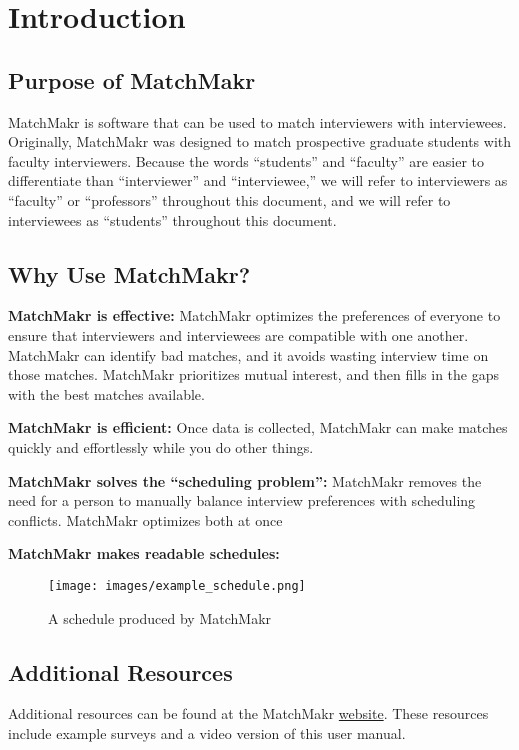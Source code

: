 

\chapter{Introduction}

\section{Purpose of MatchMakr}
MatchMakr is software that can be used to match interviewers with interviewees.  Originally, MatchMakr was designed to match prospective graduate students with faculty interviewers.  Because the words ``students'' and ``faculty'' are easier to differentiate than ``interviewer'' and ``interviewee,'' we will refer to interviewers as ``faculty'' or ``professors'' throughout this document, and we will refer to interviewees as ``students'' throughout this document.

\section{Why Use MatchMakr?}
\par
\textbf{MatchMakr is effective:} 
MatchMakr optimizes the preferences of everyone to ensure that interviewers and interviewees are compatible with one another.  MatchMakr can identify bad matches, and it avoids wasting interview time on those matches.  MatchMakr prioritizes mutual interest, and then fills in the gaps with the best matches available.

\par
\textbf{MatchMakr is efficient:}
Once data is collected, MatchMakr can make matches quickly and effortlessly while you do other things.

\par
\textbf{MatchMakr solves the ``scheduling problem'':}
MatchMakr removes the need for a person to manually balance interview preferences with scheduling conflicts.  MatchMakr optimizes both at once


\textbf{MatchMakr makes readable schedules:}
\begin{figure}[!h]
	\centering
	\texttt{[image: images/example\_schedule.png]}
	\caption{\label{fig:example_schedule} A schedule produced by MatchMakr}
\end{figure}

\section{Additional Resources}
Additional resources can be found at the MatchMakr \href{\website}{website}.  These resources include example surveys and a video version of this user manual.